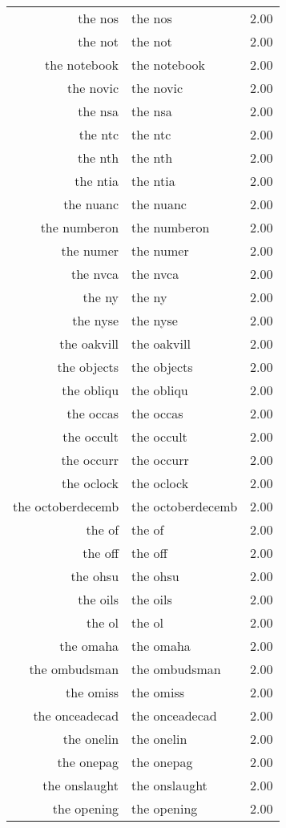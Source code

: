 \begin{table}[ht]
\begin{tabular}{rlr}
  the nos & the nos & 2.00 \\ 
  the not & the not & 2.00 \\ 
  the notebook & the notebook & 2.00 \\ 
  the novic & the novic & 2.00 \\ 
  the nsa & the nsa & 2.00 \\ 
  the ntc & the ntc & 2.00 \\ 
  the nth & the nth & 2.00 \\ 
  the ntia & the ntia & 2.00 \\ 
  the nuanc & the nuanc & 2.00 \\ 
  the numberon & the numberon & 2.00 \\ 
  the numer & the numer & 2.00 \\ 
  the nvca & the nvca & 2.00 \\ 
  the ny & the ny & 2.00 \\ 
  the nyse & the nyse & 2.00 \\ 
  the oakvill & the oakvill & 2.00 \\ 
  the objects & the objects & 2.00 \\ 
  the obliqu & the obliqu & 2.00 \\ 
  the occas & the occas & 2.00 \\ 
  the occult & the occult & 2.00 \\ 
  the occurr & the occurr & 2.00 \\ 
  the oclock & the oclock & 2.00 \\ 
  the octoberdecemb & the octoberdecemb & 2.00 \\ 
  the of & the of & 2.00 \\ 
  the off & the off & 2.00 \\ 
  the ohsu & the ohsu & 2.00 \\ 
  the oils & the oils & 2.00 \\ 
  the ol & the ol & 2.00 \\ 
  the omaha & the omaha & 2.00 \\ 
  the ombudsman & the ombudsman & 2.00 \\ 
  the omiss & the omiss & 2.00 \\ 
  the onceadecad & the onceadecad & 2.00 \\ 
  the onelin & the onelin & 2.00 \\ 
  the onepag & the onepag & 2.00 \\ 
  the onslaught & the onslaught & 2.00 \\ 
  the opening & the opening & 2.00 \\ 

\end{tabular}
\end{table}
